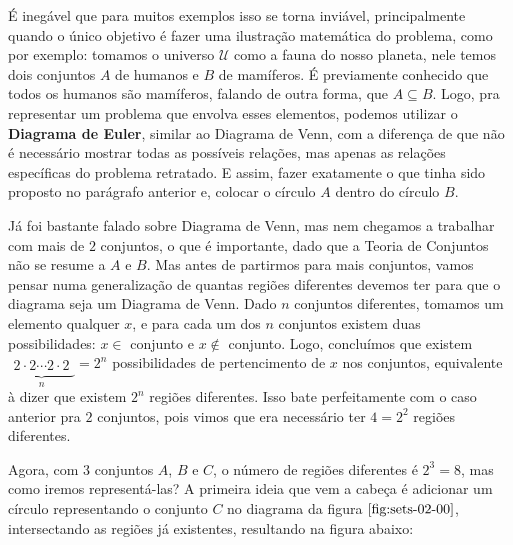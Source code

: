     
    É inegável que para muitos exemplos isso se torna inviável, principalmente quando o único objetivo é fazer uma ilustração matemática do problema, como por exemplo: tomamos o universo $\mathcal U$ como a fauna do nosso planeta, nele temos dois conjuntos $A$ de humanos e $B$ de mamíferos. É previamente conhecido que todos os humanos são mamíferos, falando de outra forma, que $A \subseteq B$. Logo, pra representar um problema que envolva esses elementos, podemos utilizar o \textbf{Diagrama de Euler}, similar ao Diagrama de Venn, com a diferença de que não é necessário mostrar todas as possíveis relações, mas apenas as relações específicas do problema retratado. E assim, fazer exatamente o que tinha sido proposto no parágrafo anterior e, colocar o círculo $A$ dentro do círculo $B$.


    Já foi bastante falado sobre Diagrama de Venn, mas nem chegamos a trabalhar com mais de $2$ conjuntos, o que é importante, dado que a Teoria de Conjuntos não se resume a $A$ e $B$. Mas antes de partirmos para mais conjuntos, vamos pensar numa generalização de quantas regiões diferentes devemos ter para que o diagrama seja um Diagrama de Venn. Dado $n$ conjuntos diferentes, tomamos um elemento qualquer $x$, e para cada um dos $n$ conjuntos existem duas possibilidades: $x \in $ conjunto e $x \notin $ conjunto. Logo, concluímos que existem $\underbrace{\begin{matrix} 2\cdot2\cdots2\cdot2\end{matrix}}_{n} = 2^n$ possibilidades de pertencimento de $x$ nos conjuntos, equivalente à dizer que existem $2^n$ regiões diferentes. Isso bate perfeitamente com o caso anterior pra $2$ conjuntos, pois vimos que era necessário ter $4=2^2$ regiões diferentes.

    Agora, com $3$ conjuntos $A$, $B$ e $C$, o número de regiões diferentes é $2^3=8$, mas como iremos representá-las? A primeira ideia que vem a cabeça é adicionar um círculo representando o conjunto $C$ no diagrama da figura $\ref{fig:sets-02-00}$, intersectando as regiões já existentes, resultando na figura abaixo:


